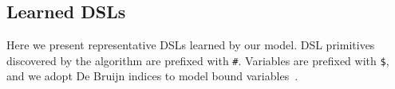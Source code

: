 \documentclass{article}
\newcommand{\system}{\textsc{DreamCoder}~}
\newcommand{\code}[1]{{\footnotesize\texttt{#1}}}
\begin{document}



\subsection{Learned DSLs}
Here we present representative DSLs learned by our model. DSL primitives
discovered by the algorithm are prefixed with \lstinline!#!.
Variables are prefixed with \lstinline!$!, and we adopt De Bruijn indices to
model bound variables~\cite{pierce}.


\end{document}

